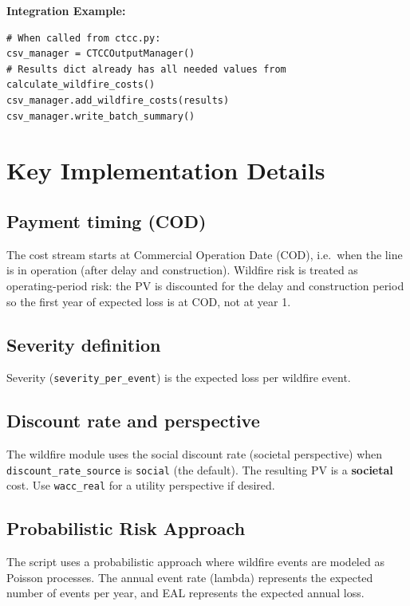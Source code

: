 \documentclass[ctcc_full_documentation.tex]{subfiles}
\begin{document}
\textbf{Integration Example:}

\begin{lstlisting}
# When called from ctcc.py:
csv_manager = CTCCOutputManager()
# Results dict already has all needed values from calculate_wildfire_costs()
csv_manager.add_wildfire_costs(results)
csv_manager.write_batch_summary()
\end{lstlisting}

\section{Key Implementation Details}

\subsection{Payment timing (COD)}

The cost stream starts at Commercial Operation Date (COD), i.e.\ when the line is in operation (after delay and construction). Wildfire risk is treated as operating-period risk: the PV is discounted for the delay and construction period so the first year of expected loss is at COD, not at year 1.

\subsection{Severity definition}

Severity (\texttt{severity\_per\_event}) is the expected loss per wildfire event.

\subsection{Discount rate and perspective}

The wildfire module uses the social discount rate (societal perspective) when \texttt{discount\_rate\_source} is \texttt{social} (the default). The resulting PV is a \textbf{societal} cost. Use \texttt{wacc\_real} for a utility perspective if desired.

\subsection{Probabilistic Risk Approach}

The script uses a probabilistic approach where wildfire events are modeled as Poisson processes. The annual event rate (lambda) represents the expected number of events per year, and EAL represents the expected annual loss.
\end{document}
